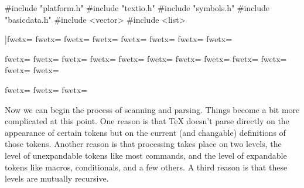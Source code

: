 #include "platform.h"
#include "textio.h"
#include "symbols.h"
#include "basicdata.h"
#include <vector>
#include <list>

]fwetx=%
\fwbtx[
]fwetx=%
\fwbtx[
]fwetx=%
\fwbtx[
]fwetx=%
\fwbtx[
]fwetx=%
\fwbtx[
]fwetx=%
\fwbtx[
]fwetx=%
\fwbtx[

#endif
]fwetx=%
\fwcdef 
\fwbeginmacronotes
{}
\fwendmacronotes
\fwendmacro


\fwbeginmacro
{}\fwequals \fwodef {}fwetx=%
\fwbtx[
]fwetx=%
\fwbtx[
]fwetx=%
\fwbtx[
]fwetx=%
\fwbtx[
]fwetx=%
\fwbtx[
]fwetx=%
\fwbtx[
]fwetx=%
\fwbtx[
]fwetx=%
\fwbtx[
]fwetx=%
\fwbtx[
]fwetx=%
\fwbtx[
]fwetx=%
\fwbtx[
]fwetx=%
\fwcdef 
\fwbeginmacronotes
{}
\fwendmacronotes
\fwendmacro


\fwbeginmacro
{}\fwequals \fwodef {}fwetx=%
\fwbtx[
]fwetx=%
\fwoparen \fwoquote{}\fwcquote\fwcomma \fwoquote{}\fwcquote\fwcparen \fwbtx[
]fwetx=%
\fwcdef 
\fwbeginmacronotes
{}
\fwendmacronotes
\fwendmacro









Now we can begin the process of scanning and parsing.  Things become
a bit more complicated at this point. One reason is that \TeX{}
doesn't parse directly on the appearance of certain
tokens but on the current (and changable) definitions of those tokens.
Another reason is that processing takes place on two levels, the level
of unexpandable tokens like most commands, and the level of expandable
tokens like macros, conditionals, and a few others.
A third reason is that these levels are mutually recursive.

